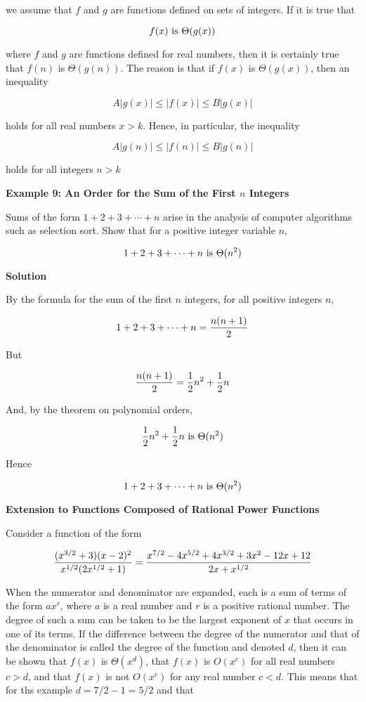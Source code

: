 we assume that $f$ and $g$ are functions defined on sets of integers. If it is true that

$$f(x)\hbox{ is } \Theta(g(x))$$

where $f$ and $g$ are functions defined for real numbers, then it is certainly true that $f(n)$ is $\Theta(g(n))$. The reason is that if $f(x)$ is $\Theta(g(x))$, then an inequality

$$A|g(x)|\leq|f(x)|\leq B|g(x)|$$

holds for all real numbers $x>k$. Hence, in particular, the inequality

$$A|g(n)|\leq|f(n)|\leq B|g(n)|$$

holds for all integers $n>k$

\filbreak
\vskip 1cm
{\bf Example 9: An Order for the Sum of the First $n$ Integers}

\vskip 1mm
Sums of the form $1+2+3+\cdots+n$ arise in the analysis of computer algorithms such as selection sort. Show that for a positive integer variable $n$,

$$1+2+3+\cdots+n\hbox{ is } \Theta(n^2)$$

\vskip 3mm
{\bf Solution}

\vskip 1mm
By the formula for the sum of the first $n$ integers, for all positive integers $n$,

$$1+2+3+\cdots+n={n(n+1)\over 2}$$

But

$${n(n+1)\over 2}={1\over 2}n^2+{1\over 2}n$$

And, by the theorem on polynomial orders,

$${1\over 2}n^2+{1\over 2}n\hbox{ is } \Theta(n^2)$$

Hence

$$1+2+3+\cdots+n\hbox{ is } \Theta(n^2)$$

\filbreak
\vskip 1cm
{\bf Extension to Functions Composed of Rational Power Functions}

\vskip 1mm
Consider a function of the form

$${(x^{3/2}+3)(x-2)^2\over x^{1/2}(2x^{1/2}+1)}={x^{7/2}-4x^{5/2}+4x^{3/2}+3x^2-12x+12\over 2x+x^{1/2}}$$

When the numerator and denominator are expanded, each is a sum of terms of the form $ax^r$, where $a$ is a real number and $r$ is a positive rational number. The degree of such a sum can be taken to be the largest exponent of $x$ that occurs in one of its terms. If the difference between the degree of the numerator and that of the denominator is called the degree of the function and denoted $d$, then it can be shown that $f(x)$ is $\Theta(x^d)$, that $f(x)$ is $O(x^c)$ for all real numbers $c>d$, and that $f(x)$ is not $O(x^c)$ for any real number $c<d$. This means that for ths example $d=7/2-1=5/2$ and that

